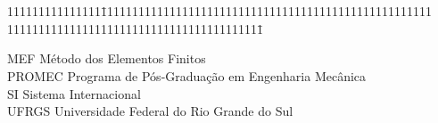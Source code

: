 \chapter*{\hfill \laaname \hfill}

\begin{tabbing}
111111111111111\=11111111111111111111111111111111111111111111111111111
11111111111111111111111111111111111111111\=\kill


MEF \> Método dos Elementos Finitos \\

PROMEC \> Programa de Pós-Graduação em Engenharia Mecânica \\

SI \> Sistema Internacional \\

UFRGS \> Universidade Federal do Rio Grande do Sul \\
\end{tabbing}